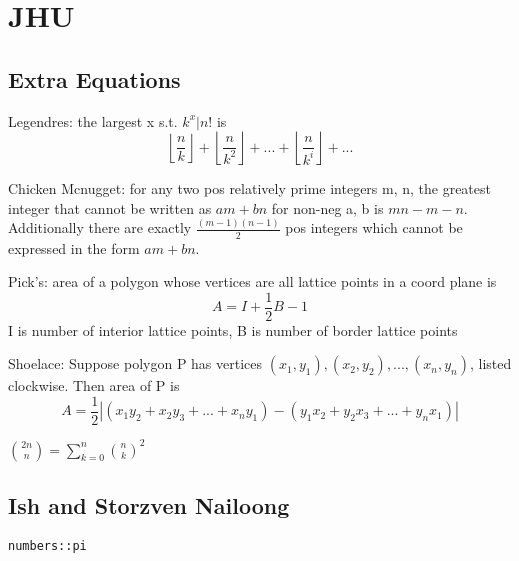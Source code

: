 \chapter{JHU}

\section{Extra Equations}
Legendres: the largest x s.t. $k^{x} | n!$ is
\[ \left \lfloor{\frac{n}{k}}\right \rfloor + \left \lfloor{\frac{n}{k^{2}}}\right \rfloor + ... + \left \lfloor{\frac{n}{k^{i}}}\right \rfloor + ...\]

Chicken Mcnugget: for any two pos relatively prime integers m, n, the greatest integer that cannot be written as $am+bn$ for non-neg a, b is $mn-m-n$. Additionally
there are exactly $\frac{(m-1)(n-1)}{2}$ pos integers which cannot be expressed in the form $am+bn$.

Pick's: area of a polygon whose vertices are all lattice points in a coord plane is 
\[ A = I + \frac{1}{2}B-1\]
I is number of interior lattice points, B is number of border lattice points

Shoelace: Suppose polygon P has vertices $(x_1, y_1), (x_2, y_2), ..., (x_n, y_n)$, listed clockwise. Then area of P is
\[ A = \frac{1}{2}|(x_1y_2 + x_2y_3 + ... + x_ny_1) - (y_1x_2+y_2x_3+...+y_nx_1)|\]

${2n \choose n} = \sum_{k=0}^{n}{n \choose k}^{2}$


\section{Ish and Storzven Nailoong}
    \lstinline|numbers::pi|
